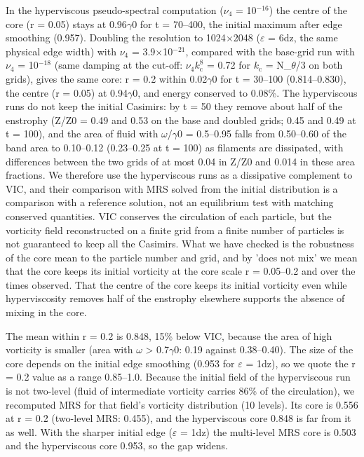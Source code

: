 \documentclass[11pt]{article}
\begin{document}
In the hyperviscous pseudo-spectral computation ($\nu_{4}{}$ = 10$^{-16}$) the centre of the core (r = 0.05) stays at 0.96$\gamma{}$0 for t = 70--400, the initial maximum after edge smoothing (0.957). Doubling the resolution to 1024$\times{}$2048 ($\varepsilon{}$ = 6dz, the same physical edge width) with $\nu_{4}{}$ = 3.9$\times{}$10$^{-21}$, compared with the base-grid run with $\nu_{4}{}$ = 10$^{-18}$ (same damping at the cut-off: $\nu_{4}{}k_{\mathrm{c}}^{8}$ = 0.72 for $k_{\mathrm{c}}$ = N\_$\theta{}$/3 on both grids), gives the same core: r = 0.2 within 0.02$\gamma{}$0 for t = 30--100 (0.814--0.830), the centre (r = 0.05) at 0.94$\gamma{}$0, and energy conserved to 0.08\%. The hyperviscous runs do not keep the initial Casimirs: by t = 50 they remove about half of the enstrophy (Z/Z0 = 0.49 and 0.53 on the base and doubled grids; 0.45 and 0.49 at t = 100), and the area of fluid with $\omega{}$/$\gamma{}$0 = 0.5--0.95 falls from 0.50--0.60 of the band area to 0.10--0.12 (0.23--0.25 at t = 100) as filaments are dissipated, with differences between the two grids of at most 0.04 in Z/Z0 and 0.014 in these area fractions. We therefore use the hyperviscous runs as a dissipative complement to VIC, and their comparison with MRS solved from the initial distribution is a comparison with a reference solution, not an equilibrium test with matching conserved quantities. VIC conserves the circulation of each particle, but the vorticity field reconstructed on a finite grid from a finite number of particles is not guaranteed to keep all the Casimirs. What we have checked is the robustness of the core mean to the particle number and grid, and by 'does not mix' we mean that the core keeps its initial vorticity at the core scale r = 0.05--0.2 and over the times observed. That the centre of the core keeps its initial vorticity even while hyperviscosity removes half of the enstrophy elsewhere supports the absence of mixing in the core.

The mean within r = 0.2 is 0.848, 15\% below VIC, because the area of high vorticity is smaller (area with $\omega{}$ > 0.7$\gamma{}$0: 0.19 against 0.38--0.40). The size of the core depends on the initial edge smoothing (0.953 for $\varepsilon{}$ = 1dz), so we quote the r = 0.2 value as a range 0.85--1.0. Because the initial field of the hyperviscous run is not two-level (fluid of intermediate vorticity carries 86\% of the circulation), we recomputed MRS for that field's vorticity distribution (10 levels). Its core is 0.556 at r = 0.2 (two-level MRS: 0.455), and the hyperviscous core 0.848 is far from it as well. With the sharper initial edge ($\varepsilon{}$ = 1dz) the multi-level MRS core is 0.503 and the hyperviscous core 0.953, so the gap widens.
\end{document}
